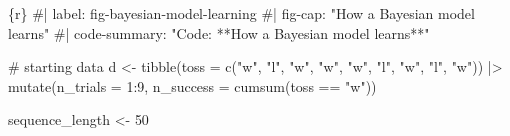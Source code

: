 \documentclass[
  letterpaper,
  DIV=11,
  numbers=noendperiod]{scrreprt}
\newenvironment{Shaded}{\begin{snugshade}}{\end{snugshade}}
\newcommand{\AttributeTok}[1]{\textcolor[rgb]{0.40,0.45,0.13}{#1}}
\newcommand{\CommentTok}[1]{\textcolor[rgb]{0.37,0.37,0.37}{#1}}
\newcommand{\DecValTok}[1]{\textcolor[rgb]{0.68,0.00,0.00}{#1}}
\newcommand{\FunctionTok}[1]{\textcolor[rgb]{0.28,0.35,0.67}{#1}}
\newcommand{\InformationTok}[1]{\textcolor[rgb]{0.37,0.37,0.37}{#1}}
\newcommand{\NormalTok}[1]{\textcolor[rgb]{0.00,0.23,0.31}{#1}}
\newcommand{\OtherTok}[1]{\textcolor[rgb]{0.00,0.23,0.31}{#1}}
\newcommand{\SpecialCharTok}[1]{\textcolor[rgb]{0.37,0.37,0.37}{#1}}
\newcommand{\StringTok}[1]{\textcolor[rgb]{0.13,0.47,0.30}{#1}}
\newcommand*\circled[1]{\tikz[baseline=(char.base)]{
          \node[shape=circle,draw,inner sep=1pt] (char) {{\scriptsize#1}};}}
\begin{document}
\hypertarget{annotated-cell-27}{%
\label{annotated-cell-27}}%
\begin{Shaded}
\begin{Highlighting}[]
\InformationTok{\textasciigrave{}\textasciigrave{}\textasciigrave{}\{r\}}
\CommentTok{\#| label: fig{-}bayesian{-}model{-}learning}
\CommentTok{\#| fig{-}cap: "How a Bayesian model learns"}
\CommentTok{\#| code{-}summary: "Code: **How a Bayesian model learns**"}

\CommentTok{\# starting data}
\NormalTok{d }\OtherTok{\textless{}{-}} \FunctionTok{tibble}\NormalTok{(}\AttributeTok{toss =} \FunctionTok{c}\NormalTok{(}\StringTok{"w"}\NormalTok{, }\StringTok{"l"}\NormalTok{, }\StringTok{"w"}\NormalTok{, }\StringTok{"w"}\NormalTok{, }\StringTok{"w"}\NormalTok{, }\StringTok{"l"}\NormalTok{, }\StringTok{"w"}\NormalTok{, }\StringTok{"l"}\NormalTok{, }\StringTok{"w"}\NormalTok{)) }\SpecialCharTok{|\textgreater{}} 
    \FunctionTok{mutate}\NormalTok{(}\AttributeTok{n\_trials  =} \DecValTok{1}\SpecialCharTok{:}\DecValTok{9}\NormalTok{, }\AttributeTok{n\_success =} \FunctionTok{cumsum}\NormalTok{(toss }\SpecialCharTok{==} \StringTok{"w"}\NormalTok{))}

\NormalTok{sequence\_length }\OtherTok{\textless{}{-}} \DecValTok{50} \hspace*{\fill}\NormalTok{\circled{1}}


\end{Highlighting}
\end{Shaded}
\end{document}

